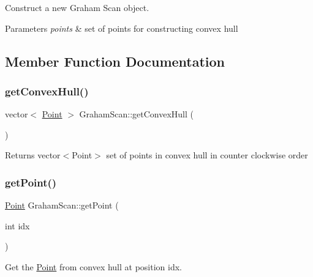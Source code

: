 Construct a new Graham Scan object. 


\begin{DoxyParams}{Parameters}
{\em points} & set of points for constructing convex hull \\
\hline
\end{DoxyParams}


\subsection{Member Function Documentation}
\mbox{\label{classGrahamScan_a374db012cb6a96fcb8530d07cddd498e}} 
\subsubsection{\texorpdfstring{get\+Convex\+Hull()}{getConvexHull()}}
{\footnotesize\ttfamily vector$<$ \mbox{\hyperlink{classPoint}{Point}} $>$ Graham\+Scan\+::get\+Convex\+Hull (\begin{DoxyParamCaption}{ }\end{DoxyParamCaption})}

\begin{DoxyReturn}{Returns}
vector$<$\+Point$>$ set of points in convex hull in counter clockwise order 
\end{DoxyReturn}
\mbox{\label{classGrahamScan_a79b1642bc347f2f6e517b2f3415e871d}} 
\subsubsection{\texorpdfstring{get\+Point()}{getPoint()}}
{\footnotesize\ttfamily \mbox{\hyperlink{classPoint}{Point}} Graham\+Scan\+::get\+Point (\begin{DoxyParamCaption}\item[{int}]{idx }\end{DoxyParamCaption})\hspace{0.3cm}{\ttfamily [private]}}



Get the \mbox{\hyperlink{classPoint}{Point}} from convex hull at position \textquotesingle{}idx\textquotesingle{}. 


